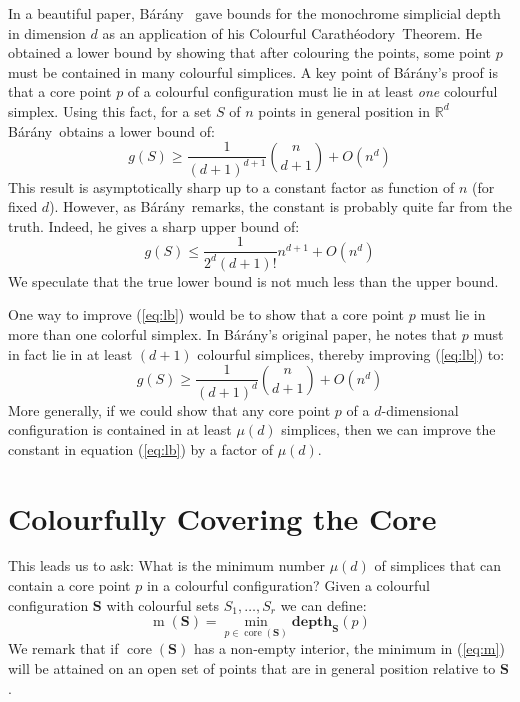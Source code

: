 \documentclass[epsbox,12pt,reqno]{amsart}
\theoremstyle{definition}
\theoremstyle{remark}
\def\csd{\mathbf{depth}}
\def\S{\mathbf{S}}
\def\core{\operatorname{core}}
\def\bara{B\'ar\'any}
\def\cara{Carath\'eodory}
\def\R{\mathbb{R}}
\def\m{\operatorname{m}}
\begin{document}
In a beautiful paper, \bara~\cite{Bar82} gave bounds for the 
monochrome simplicial depth in dimension $d$ as an application 
of his Colourful \cara~Theorem.  He obtained a lower bound by
showing that after colouring the points, some point $p$ must be
contained in many colourful simplices.  
A key point of \bara's proof is that a core point $p$ of
a colourful configuration must lie in at least {\it one} colourful
simplex.  Using this fact, for a set $S$ of $n$ points in general
position in ${\R}^d$ \bara~obtains a lower bound of:
\begin{equation}\label{eq:lb}
g(S) \ge \frac{1}{(d+1)^{d+1}}\binom{n}{d+1}+O(n^d)
\end{equation}
This result is asymptotically sharp up to a constant factor as function
of $n$ (for fixed $d$).  However, as \bara~remarks, the constant is
probably quite far from the truth.  Indeed, he gives a sharp upper
bound of:
\begin{equation}\label{eq:ub}
g(S) \le \frac{1}{2^d (d+1)!} n^{d+1} + O(n^d)
\end{equation}
We speculate that the true lower bound is not much less than the 
upper bound.  

One way to improve (\ref{eq:lb}) would be to show that a core point $p$
must lie in more than one colorful simplex.  In \bara's original
paper, he notes that $p$ must in fact lie in at least $(d+1)$ colourful 
simplices, thereby improving (\ref{eq:lb}) to:
\begin{equation}\label{eq:lb2}
g(S) \ge \frac{1}{(d+1)^{d}}\binom{n}{d+1}+O(n^d)
\end{equation}
More generally, if we could show that any core point $p$ of a
$d$-dimensional configuration is contained
in at least $\mu(d)$ simplices, then we can improve the constant
in equation (\ref{eq:lb}) by a factor of $\mu(d)$.

%
%
\section{Colourfully Covering the Core}\label{se:covering}
This leads us to ask: What is the minimum number $\mu(d)$ of simplices that
can contain a core point $p$ in a colourful configuration?  
Given a colourful configuration $\S$ with colourful
sets $S_1, \ldots, S_r$ we can define:
\begin{equation}\label{eq:m}
\m(\S)= \min_{p \in \core(\S)} \csd_\S(p)
\end{equation} 
We remark that if $\core(\S)$ has a non-empty interior, the
minimum in (\ref{eq:m}) will be attained on an open set of
points that are in general position relative to $\S$.
\end{document}
